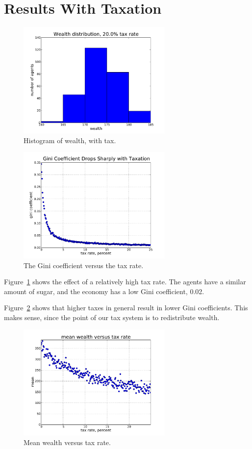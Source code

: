\documentclass[10pt]{book}
\begin{document}
\section{Results With Taxation}

\begin{figure}[ht]
\centerline{\includegraphics[width=3.0in]{figs/pmf_20percent.pdf}}
\caption{Histogram of wealth, with tax.\label{fig.withtax}}
\end{figure}

\begin{figure}[ht]
\centerline{\includegraphics[width=3.0in]{figs/gini_coeff.pdf}}
\caption{The Gini coefficient versus the tax rate.\label{fig.gini}}
\end{figure}

Figure~\ref{fig.withtax} shows the effect of a relatively high tax
rate. The agents have a similar amount of sugar, and the economy has a
low Gini coefficient, 0.02.

Figure~\ref{fig.gini} shows that
higher taxes in general result in lower Gini coefficients. This makes
sense, since the point of our tax system is to redistribute
wealth.

\begin{figure}[ht]
\centerline{\includegraphics[width=3.0in]{figs/mean_wealth.pdf}}
\caption{Mean wealth versus tax rate.\label{fig.wealth}}
\end{figure}
\end{document}
